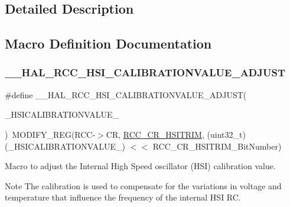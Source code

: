 \subsection{Detailed Description}


\subsection{Macro Definition Documentation}
\mbox{\label{group___r_c_c___h_s_i___configuration_ga36991d340af7ad14b79f204c748b0e3e}} 
\subsubsection{\texorpdfstring{\+\_\+\+\_\+\+H\+A\+L\+\_\+\+R\+C\+C\+\_\+\+H\+S\+I\+\_\+\+C\+A\+L\+I\+B\+R\+A\+T\+I\+O\+N\+V\+A\+L\+U\+E\+\_\+\+A\+D\+J\+U\+ST}{\_\_HAL\_RCC\_HSI\_CALIBRATIONVALUE\_ADJUST}}
{\footnotesize\ttfamily \#define \+\_\+\+\_\+\+H\+A\+L\+\_\+\+R\+C\+C\+\_\+\+H\+S\+I\+\_\+\+C\+A\+L\+I\+B\+R\+A\+T\+I\+O\+N\+V\+A\+L\+U\+E\+\_\+\+A\+D\+J\+U\+ST(\begin{DoxyParamCaption}\item[{}]{\+\_\+\+H\+S\+I\+C\+A\+L\+I\+B\+R\+A\+T\+I\+O\+N\+V\+A\+L\+U\+E\+\_\+ }\end{DoxyParamCaption})~M\+O\+D\+I\+F\+Y\+\_\+\+R\+EG(R\+CC-\/$>$CR, \hyperlink{group___peripheral___registers___bits___definition_ga5cb4397b2095c31660a01b748386aa70}{R\+C\+C\+\_\+\+C\+R\+\_\+\+H\+S\+I\+T\+R\+IM}, (uint32\+\_\+t)(\+\_\+\+H\+S\+I\+C\+A\+L\+I\+B\+R\+A\+T\+I\+O\+N\+V\+A\+L\+U\+E\+\_\+) $<$$<$ R\+C\+C\+\_\+\+C\+R\+\_\+\+H\+S\+I\+T\+R\+I\+M\+\_\+\+Bit\+Number)}



Macro to adjust the Internal High Speed oscillator (H\+SI) calibration value. 

\begin{DoxyNote}{Note}
The calibration is used to compensate for the variations in voltage and temperature that influence the frequency of the internal H\+SI RC. 
\end{DoxyNote}

